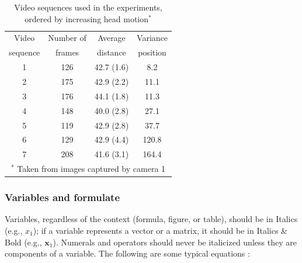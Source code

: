 \documentclass[twoside,twocolumn]{article}
\begin{document}
\begin{table}[thp]\footnotesize
\centering
\caption{Video sequences used in the experiments, ordered by increasing head motion$^\textbf{*}$ \citep{Deniz10}} \label{Table:1}
\addtolength{\tabcolsep}{4.8pt}
\begin{tabular*}{7.95cm}{cccc}
	\toprule[0.75pt]
	 Video   & Number of &  Average   &                   Variance                   \\
	sequence &  frames   &  distance  &                   position                   \\ 
	\midrule[0.5pt]
	   1     &    126    & 42.7 (1.6) &                     8.2                      \\
	   2     &    175    & 42.9 (2.2) &                     11.1                     \\
	   3     &    176    & 44.1 (1.8) &                     11.3                     \\
	   4     &    148    & 40.0 (2.8) &                     27.1                     \\
	   5     &    119    & 42.9 (2.8) &                     37.7                     \\
	   6     &    129    & 42.9 (4.4) &                    120.8                     \\
	   7     &    208    & 41.6 (3.1) &                    164.4                     \\ 
	\bottomrule[0.75pt]
	\multicolumn{4}{p{6cm}}{\scriptsize $^*$ Taken from images captured by camera 1}
\end{tabular*}
\end{table}

\subsubsection{Variables and formulate}

Variables, regardless of the context (formula, figure, or table), should be in Italics (e.g., $x_1$); if a variable represents a vector or a matrix, it should be in Italics \& Bold (e.g., $\bm{x}_1$). Numerals and operators should never be italicized unless they are components of a variable. The following are some typical equations \citep{Theodoridis11}:
\end{document}

